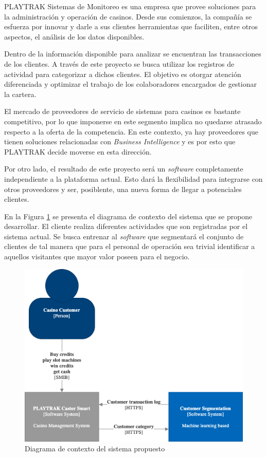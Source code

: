 \documentclass[11pt]{charter}
\begin{document}
PLAYTRAK Sistemas de Monitoreo es una empresa que provee soluciones para la administración y operación
de casinos. Desde sus comienzos, la compañía se esfuerza por innovar y darle a sus clientes
herramientas que faciliten, entre otros aspectos, el análisis de los datos disponibles.

Dentro de la información disponible para analizar se encuentran las transacciones de los clientes. A
través de este proyecto se busca utilizar los registros de actividad para categorizar a dichos clientes.
El objetivo es otorgar atención diferenciada y optimizar el trabajo de los colaboradores encargados de 
gestionar la cartera.

El mercado de proveedores de servicio de sistemas para casinos es bastante competitivo, por lo que imponerse
en este segmento implica no quedarse atrasado respecto a la oferta de la competencia. En este contexto, ya hay 
proveedores que tienen soluciones relacionadas con \textit{Business Intelligence} y es por esto que PLAYTRAK
decide moverse en esta dirección.

Por otro lado, el resultado de este proyecto será un \textit{software} completamente independiente a la
plataforma actual. Esto dará la flexibilidad para integrarse con otros proveedores y ser, posiblente, una
nueva forma de llegar a potenciales clientes.

En la Figura \ref{fig:context_dia} se presenta el diagrama de contexto del sistema que se propone desarrollar.
El cliente realiza diferentes actividades que son registradas por el sistema actual. Se busca entrenar al 
\textit{software} que segmentará el conjunto de clientes de tal manera que para el personal de operación 
sea trivial identificar a aquellos visitantes que mayor valor poseen para el negocio.

\vspace{25px}

\begin{figure}[htpb]
  \centering
  \includegraphics[width=.8\textwidth]{./Figuras/context_diagram.png}
  \caption{Diagrama de contexto del sistema propuesto}
  \label{fig:context_dia}
\end{figure}
\end{document}
